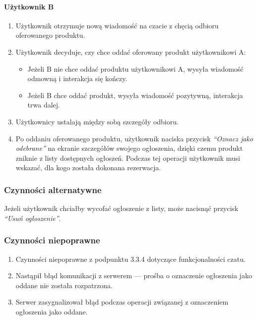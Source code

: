 \documentclass[licencjacka]{pracamgr}
\begin{document}
    \paragraph{Użytkownik B}
    \begin{enumerate}
        \item Użytkownik otrzymuje nową wiadomość na czacie z chęcią odbioru oferowanego produktu.
        \item Użytkownik decyduje, czy chce oddać oferowany produkt użytkownikowi A\@:
        \begin{itemize}
            \item Jeżeli B nie chce oddać produktu użytkownikowi A, wysyła wiadomość odmowną i interakcja się kończy.
            \item Jeżeli B chce oddać produkt, wysyła wiadomość pozytywną, interakcja trwa dalej.
        \end{itemize}
        \item Użytkownicy ustalają między sobą szczegóły odbioru.
        \item Po oddaniu oferowanego produktu, użytkownik naciska przycisk \textit{``Oznacz jako odebrane''} na ekranie szczegółów swojego ogłoszenia, dzięki czemu produkt zniknie z listy dostępnych ogłoszeń. Podczas tej operacji użytkownik musi wskazać, dla kogo została dokonana rezerwacja.
    \end{enumerate}
    \subsubsection{Czynności alternatywne}
    Jeżeli użytkownik chciałby wycofać ogłoszenie z listy, może nacisnąć przycisk \textit{``Usuń ogłoszenie''}.
    \subsubsection{Czynności niepoprawne}
    \begin{enumerate}
        \item Czynności niepoprawne z podpunktu 3.3.4 dotyczące funkcjonalności czatu.
        \item Nastąpił błąd komunikacji z serwerem --- prośba o oznaczenie ogłoszenia jako oddane nie została rozpatrzona.
        \item Serwer zasygnalizował błąd podczas operacji związanej z oznaczeniem ogłoszenia jako oddane.
    \end{enumerate}
\end{document}
